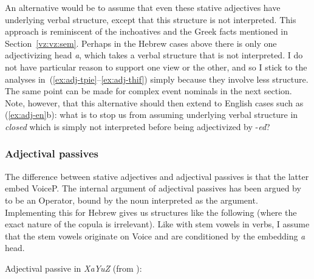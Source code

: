 \begin{exe}
\begin{xlist}
\begin{exe}
\begin{xlist}
\begin{exe}
\begin{exe}
\begin{xlist}
\begin{exe}
\begin{exe}
\begin{xlist}
\begin{exe}
\begin{xlist}
\begin{exe}
\begin{xlist}
\begin{exe}
\begin{xlist}
\begin{exe}
\begin{xlist}
\begin{xlist}
\begin{exe}
\begin{xlist}
\begin{exe}
\begin{xlist}
\begin{exe}
\begin{exe}
\begin{exe}
\begin{xlist}
\begin{exe}
\begin{exe}
\begin{xlist}
\begin{exe}
\begin{xlist}
\begin{exe}
\begin{xlist}
\begin{exe}
\begin{xlist}
\begin{xlist}
\begin{exe}
\begin{xlist}
\begin{exe}
\begin{xlist}
\begin{exe}
\begin{xlist}
\begin{exe}
\begin{xlist}
\begin{exe}
\begin{exe}
\begin{exe}
\begin{exe}
An alternative would be to assume that even these stative adjectives have underlying verbal structure, except that this structure is not interpreted. This approach is reminiscent of the inchoatives and the Greek facts mentioned in Section~\ref{vz:vz:sem}. Perhaps in the Hebrew cases above there is only one adjectivizing head \emph{a}, which takes a verbal structure that is not interpreted. I do not have particular reason to support one view or the other, and so I stick to the analyses in~(\ref{ex:adj-tpie}--\ref{ex:adj-thif}) simply because they involve less structure. The same point can be made for complex event nominals in the next section. Note, however, that this alternative should then extend to English cases such as (\ref{ex:adj-en}b): what is to stop us from assuming underlying verbal structure in \emph{closed} which is simply not interpreted before being adjectivized by -\emph{ed}?

		\subsubsection{Adjectival passives}
The difference between stative adjectives and adjectival passives is that the latter embed VoiceP. The internal argument of adjectival passives has been argued by \citet[386]{bruening14nllt} to be an Operator, bound by the noun interpreted as the argument. Implementing this for Hebrew gives us structures like the following (where the exact nature of the copula is irrelevant). Like with stem vowels in verbs, I assume that the stem vowels originate on Voice and are conditioned by the embedding \emph{a} head.
 \begin{exe}
 \ex \label{ex:adjpass-heb1-tree} Adjectival passive in \emph{XaYuZ} (from {\tkal}): 
 \begin{xlist} 
    

\end{xlist}
\end{exe}
\end{exe}
\end{exe}
\end{exe}
\end{exe}
\end{xlist}
\end{exe}
\end{xlist}
\end{exe}
\end{xlist}
\end{exe}
\end{xlist}
\end{exe}
\end{xlist}
\end{xlist}
\end{exe}
\end{xlist}
\end{exe}
\end{xlist}
\end{exe}
\end{xlist}
\end{exe}
\end{exe}
\end{xlist}
\end{exe}
\end{exe}
\end{exe}
\end{xlist}
\end{exe}
\end{xlist}
\end{exe}
\end{xlist}
\end{xlist}
\end{exe}
\end{xlist}
\end{exe}
\end{xlist}
\end{exe}
\end{xlist}
\end{exe}
\end{xlist}
\end{exe}
\end{exe}
\end{xlist}
\end{exe}
\end{exe}
\end{xlist}
\end{exe}
\end{xlist}
\end{exe}
